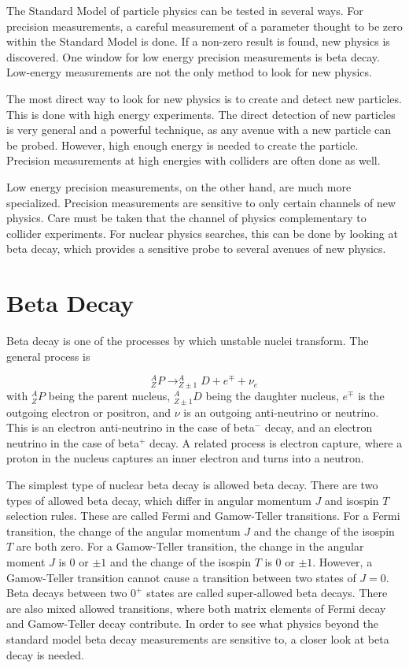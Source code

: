 \documentclass[../MaxHughesThesis.tex]{subfiles}
\begin{document}
The Standard Model of particle physics can be tested in several ways.
For precision measurements, a careful measurement of a parameter thought to be zero within the Standard Model is done.
If a non-zero result is found, new physics is discovered.
One window for low energy precision measurements is beta decay.
Low-energy measurements are not the only method to look for new physics.

The most direct way to look for new physics is to create and detect new particles.
This is done with high energy experiments. 
The direct detection of new particles is very general and a powerful technique, as any avenue with a new particle can be probed.
However, high enough energy is needed to create the particle.
Precision measurements at high energies with colliders are often done as well. 
 
Low energy precision measurements, on the other hand, are much more specialized.
Precision measurements are sensitive to only certain channels of new physics.
Care must be taken that the channel of physics complementary to collider experiments. 
For nuclear physics searches, this can be done by looking at beta decay, which provides a sensitive probe to several avenues of new physics.

\section{Beta Decay}
Beta decay is one of the processes by which unstable nuclei transform. 
The general process is %

\begin{equation}
	\label{eq:betadecay}
	^{A}_{Z}P \rightarrow ^{A}_{Z\pm 1}D + e^{\mp} + \nu_{e}
\end{equation}
with $^{A}_{Z}P$ being the parent nucleus, $^{A}_{Z \pm 1}D$ being the daughter nucleus, $e^{\mp}$ is the outgoing electron or positron, and $\nu$ is an outgoing anti-neutrino or neutrino.
This is an electron anti-neutrino in the case of beta$^{-}$ decay, and an electron neutrino in the case of beta$^{+}$ decay. 
A related process is electron capture, where a proton in the nucleus captures an inner electron and turns into a neutron.

The simplest type of nuclear beta decay is allowed beta decay.
There are two types of allowed beta decay, which differ in angular momentum $J$ and isospin $T$ selection rules.
These are called Fermi and Gamow-Teller transitions. 
For a Fermi transition, the change of the angular momentum $J$ and the change of the isospin $T$ are both zero.
For a Gamow-Teller transition, the change in the angular moment $J$ is $0$ or $\pm1$ and the change of the isospin $T$ is $0$ or $\pm 1$.
However, a Gamow-Teller transition cannot cause a transition between two states of $J = 0$. 
Beta decays between two $0^{+}$ states are called super-allowed beta decays.
There are also mixed allowed transitions, where both matrix elements of Fermi decay and Gamow-Teller decay contribute.
In order to see what physics beyond the standard model beta decay measurements are sensitive to, a closer look at beta decay is needed.
\end{document}
